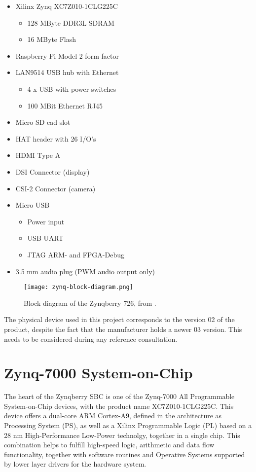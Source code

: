 \begin{itemize}
	\item Xilinx Zynq XC7Z010-1CLG225C
	\begin{itemize}
		\item 128 MByte DDR3L SDRAM
		\item 16 MByte Flash
	\end{itemize}
	\item Raspberry Pi Model 2 form factor
	\item LAN9514 USB hub with Ethernet
	\begin{itemize}
		\item 4 x USB with power switches
		\item 100 MBit Ethernet RJ45
	\end{itemize}
	\item Micro SD cad slot
	\item HAT header with 26 I/O's
	\item HDMI Type A
	\item DSI Connector (display)
	\item CSI-2 Connector (camera)
	\item Micro USB
	\begin{itemize}
		\item Power input
		\item USB UART
		\item JTAG ARM- and FPGA-Debug
	\end{itemize}
	\item 3.5 mm audio plug (PWM audio output only)
\end{itemize}

\begin{figure}[htp]
	\centering
	\texttt{[image: zynq-block-diagram.png]}
	\caption{Block diagram of the Zynqberry 726, from \cite{zynq-trm}.}
	\label{fig:zynqblock}
\end{figure}

The physical device used in this project corresponds to the version 02 of the product, despite the
fact that the manufacturer holds a newer 03 version. This needs to be considered during any
reference consultation.

\section{Zynq-7000 System-on-Chip}\label{zynq7-soc}

The heart of the Zynqberry SBC is one of the Zynq-7000 All Programmable System-on-Chip devices, with
the product name XC7Z010-1CLG225C. This device offers a dual-core ARM Cortex-A9, defined in the
architecture as Processing System (PS), as well as a Xilinx Programmable Logic (PL) based on a 28 nm
High-Performance Low-Power technolgy, together in a single chip. This combination helps to fulfill
high-speed logic, arithmetic and data flow functionality, together with software routines and
Operative Systems supported by lower layer drivers for the hardware system.

